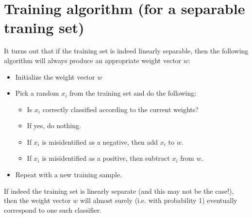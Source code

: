 \documentclass[12pt, a4paper]{article}
\numberwithin{equation}{section}
\begin{document}
\section{Training algorithm (for a separable traning set)}
It turns out that if the training set is indeed linearly separable, then the following algorithm will always produce an appropriate weight vector $w$:
\begin{itemize}
\item Initialize the weight vector $w$
\item Pick a random $x_i$ from the training set and do the following:
\begin{itemize}
\item Is $x_i$ correctly classified according to the current weights?
\item If yes, do nothing.
\item If $x_i$ is misidentified as a negative, then add $x_i$ to $w$.
\item If $x_i$ is misidentified as a positive, then subtract $x_i$ from $w$.
\end{itemize}
\item Repeat with a new training sample.
\end{itemize}
If indeed the training set is linearly separate (and this may not be the case!), then the weight vector $w$ will almost surely (i.e. with probability 1) eventually correspond to one such classifier.
\end{document}
